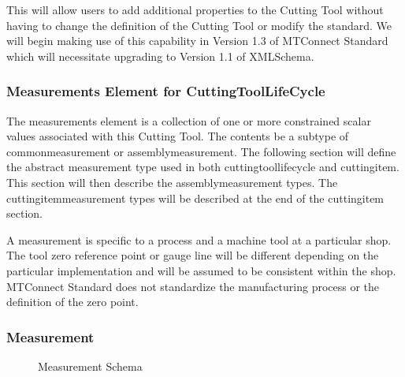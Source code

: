 \documentclass{mtconnect}	%
\begin{document}
This will allow users to add additional properties to the Cutting Tool without having to change the definition of the Cutting Tool or modify the standard.  We will begin making use of this capability in Version 1.3 of MTConnect Standard which will necessitate upgrading to Version 1.1 of XMLSchema. 

\subsubsection{Measurements Element for CuttingToolLifeCycle}

The \glspl{measurement} element is a collection of one or more constrained scalar values associated with this Cutting Tool.  The contents \MUST be a \gls{subtype} of \gls{commonmeasurement} or \gls{assemblymeasurement}.  The following section will define the abstract \gls{measurement} type used in both \gls{cuttingtoollifecycle} and \gls{cuttingitem}.  This section will then describe the \gls{assemblymeasurement} types. The \gls{cuttingitemmeasurement} types will be described at the end of the \gls{cuttingitem} section.

A measurement is specific to a process and a machine tool at a particular shop.  The tool zero reference point or gauge line will be different depending on the particular implementation and will be assumed to be consistent within the shop.  MTConnect Standard does not standardize the manufacturing process or the definition of the zero point. 

\pagebreak

\subsubsection{Measurement}

\begin{figure}[ht]
  \centering
  \caption{Measurement Schema}
  \label{fig:measurement-schema}
\end{figure}
\end{document}
